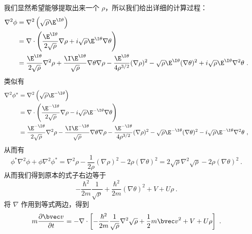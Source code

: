 我们显然希望能够提取出来一个 $\rho$，所以我们给出详细的计算过程：
\begin{equation}
\begin{split}
\nabla^2\phi &= \nabla^2\left(\sqrt\rho \E^{\I\theta}\right)\\
&=\nabla\cdot\left(\frac{\E^{\I\theta}}{2\sqrt\rho}\nabla\rho+i\sqrt{\rho} \E^{\I\theta}\nabla\theta\right)\\
&=\frac{\E^{\I\theta}}{2\sqrt\rho}\nabla^2\rho+\frac{\I \E^{\I\theta}}{\sqrt\rho}\nabla\theta\nabla\rho - \frac{\E^{\I\theta}}{4\rho^{3/2}}(\nabla\rho)^2-\sqrt\rho \E^{\I\theta}(\nabla\theta)^2+i\sqrt\rho \E^{\I\theta}\nabla^2\theta~.
\end{split}
\end{equation}
类似有
\begin{equation}
\begin{split}
\nabla^2\phi^* &= \nabla^2\left(\sqrt\rho \E^{-\I\theta}\right)\\
&=\nabla\cdot\left(\frac{\E^{-\I\theta}}{2\sqrt\rho}\nabla\rho-i\sqrt{\rho} \E^{-\I\theta}\nabla\theta\right)\\
&=\frac{\E^{-\I\theta}}{2\sqrt\rho}\nabla^2\rho-\frac{\I \E^{-\I\theta}}{\sqrt\rho}\nabla\theta\nabla\rho - \frac{\E^{-\I\theta}}{4\rho^{3/2}}(\nabla\rho)^2-\sqrt\rho \E^{-\I\theta}(\nabla\theta)^2-i\sqrt\rho \E^{-\I\theta}\nabla^2\theta~,
\end{split}
\end{equation}
从而有
\begin{equation}
\phi^*\nabla^2\phi+\phi\nabla^2\phi^* = \nabla^2\rho - \frac{1}{2\rho}(\nabla\rho)^2-2\rho(\nabla\theta)^2 = 2\sqrt\rho \nabla^2\sqrt\rho - 2\rho(\nabla\theta)^2~.
\end{equation}
从而我们得到原本的式子右边等于
\begin{equation}
-\frac{\hbar^2}{2m}\frac{1}{\sqrt\rho}+\frac{\hbar^2}{2m}(\nabla\theta)^2+V+U\rho~.
\end{equation}
将 $\nabla$ 作用到等式两边，得到
\begin{equation}
m\frac{\partial\bvec v}{\partial t} = -\nabla\cdot\left[-\frac{\hbar^2}{2m}\frac{1}{\sqrt\rho}\nabla^2\sqrt\rho + \frac{1}{2}m{\bvec v}^2+V+U\rho\right]~.
\end{equation}

